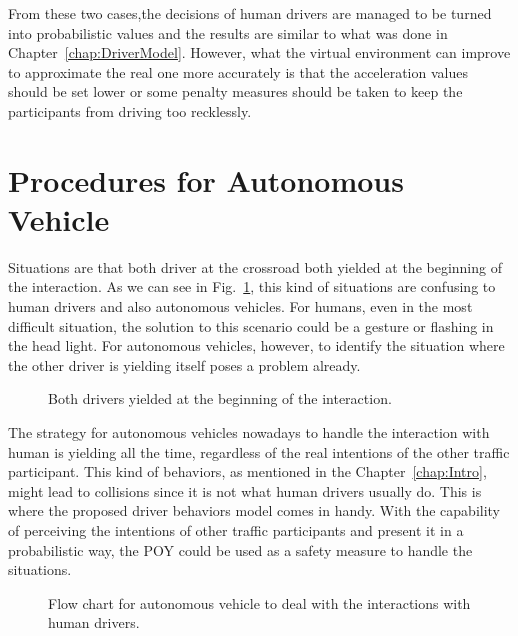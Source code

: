 From these two cases,the decisions of human drivers are managed to be turned into probabilistic values and the results are similar to what was done in Chapter~\ref{chap:DriverModel}. However, what the virtual environment can improve to approximate the real one more accurately is that the acceleration values should be set lower or some penalty measures should be taken to keep the participants from driving too recklessly.

\newpage

\section{Procedures for Autonomous Vehicle}
\label{sec:AV_procedure}

Situations are that both driver at the crossroad both yielded at the beginning of the interaction. As we can see in Fig.~\ref{fig:bothyield}, this kind of situations are confusing to human drivers and also autonomous vehicles. For humans, even in the most difficult situation, the solution to this scenario could be a gesture or flashing in the head light. For autonomous vehicles, however, to identify the situation where the other driver is yielding itself poses a problem already.

\begin{figure}[htbp!]
\begin{center}
\end{center}
\caption{Both drivers yielded at the beginning of the interaction.}
\label{fig:bothyield} 
\end{figure}

The strategy for autonomous vehicles nowadays to handle the interaction with human is yielding all the time, regardless of the real intentions of the other traffic participant. This kind of behaviors, as mentioned in the Chapter~\ref{chap:Intro}, might lead to collisions since it is not what human drivers usually do. This is where the proposed driver behaviors model comes in handy. With the capability of perceiving the intentions of other traffic participants and present it in a probabilistic way, the POY could be used as a safety measure to handle the situations. 


\begin{figure}[htbp!]
\begin{center}
\end{center}
\caption{Flow chart for autonomous vehicle to deal with the interactions with human drivers.}
\label{fig:flow_chart} 
\end{figure}

